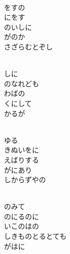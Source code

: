 \documentclass[10pt,b5j]{tarticle} %
\begin{document}
\vspace{1.5em} %
\newcommand{\linespace}{0.5em} %
\newcommand{\blocksize}{0.5\hsize} %
\newcommand{\itemmargin}{6em} %
\begin{enumerate} %
    \setlength{\itemindent}{\itemmargin} %
    \begin{minipage}[c]{\blocksize}
    
        \vspace{\linespace}
        \item~\\
        をすの\\
        にをす\\
        のいしに\\
        がのか\\
        さざらむとぞし
        
        \vspace{\linespace}
        \item~\\
        しに\\
        のなれども\\
        わばの\\
        くにして\\
        かるが
        
        \vspace{\linespace}
        \item~\\
        ゆる\\
        きぬいをに\\
        えばりする\\
        がにあり\\
        しからずやの
        
        \vspace{\linespace}
        \item~\\
        のみて\\
        のにるのに\\
        いこのはの\\
        しきものとるとても\\
        がはに
    
    \end{minipage}
\end{enumerate} %
\end{document}
